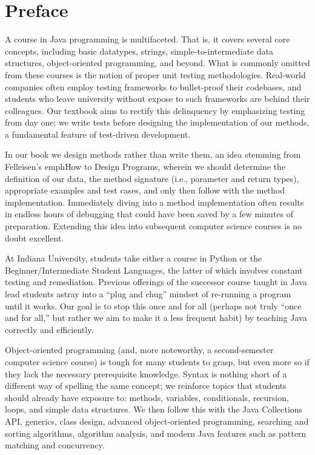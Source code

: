\chapter*{Preface}

A course in Java programming is multifaceted. That is, it covers several core concepts, including basic datatypes, strings, simple-to-intermediate data structures, object-oriented programming, and beyond. What is commonly omitted from these courses is the notion of proper unit testing methodologies. Real-world companies often employ testing frameworks to bullet-proof their codebases, and students who leave university without expose to such frameworks are behind their colleagues. Our textbook aims to rectify this delinquency by emphasizing testing from day one; we write tests before designing the implementation of our methods, a fundamental feature of test-driven development.

In our book we design methods rather than write them, an idea stemming from Felleisen's emph{How to Design Programs}, wherein we should determine the definition of our data, the method signature (i.e., parameter and return types), appropriate examples and test cases, and only then follow with the method implementation. Immediately diving into a method implementation often results in endless hours of debugging that could have been saved by a few minutes of preparation. Extending this idea into subsequent computer science courses is no doubt excellent.

At Indiana University, students take either a course in Python or the Beginner/Intermediate Student Languages, the latter of which involves constant testing and remediation. Previous offerings of the successor course taught in Java lead students astray into a ``plug and chug'' mindset of re-running a program until it works. Our goal is to stop this once and for all (perhaps not truly ``once and for all,'' but rather we aim to make it a less frequent habit) by teaching Java correctly and efficiently. 

Object-oriented programming (and, more noteworthy, a second-semester computer science course) is tough for many students to grasp, but even more so if they lack the necessary prerequisite knowledge. Syntax is nothing short of a different way of spelling the same concept; we reinforce topics that students should already have exposure to: methods, variables, conditionals, recursion, loops, and simple data structures. We then follow this with the Java Collections API, generics, class design, advanced object-oriented programming, searching and sorting algorithms, algorithm analysis, and modern Java features such as pattern matching and concurrency. 

